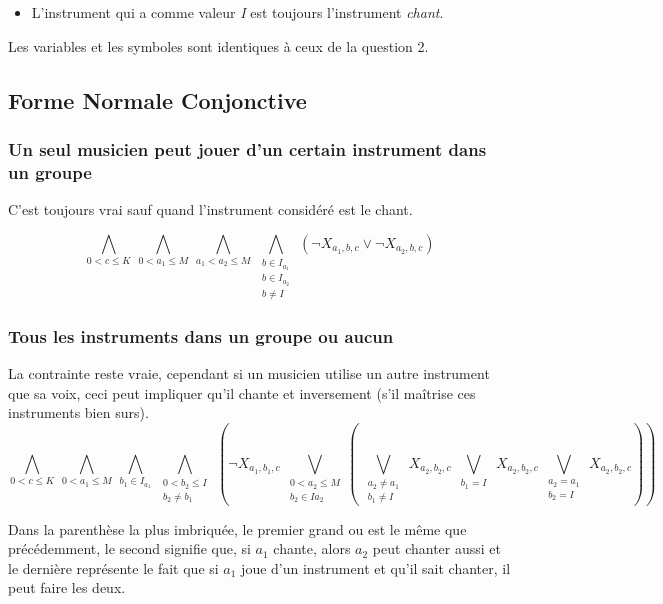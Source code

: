 \documentclass[11pt]{article}
\begin{document}
\begin{itemize}
\item L'instrument qui a comme valeur \textit{I} est toujours l'instrument \textsl{chant}.
\end{itemize}

Les variables et les symboles sont identiques à ceux de la question 2.

\subsection{Forme Normale Conjonctive}

\subsubsection{Un seul musicien peut jouer d'un certain instrument dans un groupe}

C'est toujours vrai sauf quand l'instrument considéré est le chant.

$$\bigwedge\limits_{0<c\le K}\ \bigwedge\limits_{0<a_1\le M}\ \bigwedge\limits_{a_1<a_2\le M}\ \bigwedge\limits_{\substack{b\in I_{a_1} \\ b\in I_{a_2} \\ b \ne I}}\ \left(\neg X_{a_1,b,c} \vee \neg X_{a_2,b,c}\right)$$

\subsubsection{Tous les instruments dans un groupe ou aucun}

La contrainte reste vraie, cependant si un musicien utilise un autre instrument que sa voix, ceci peut impliquer qu'il chante et inversement (s'il maîtrise ces instruments bien surs).\\

$$\bigwedge\limits_{0<c\le K}\ \bigwedge\limits_{0<a_1\le M}\ \bigwedge\limits_{b_1\in I_{a_1}}\ \bigwedge\limits_{\substack{0<b_2\le I \\ b_2 \ne b_1}}\ \left(\neg X_{a_1,b_1,c} \ \bigvee\limits_{\substack{0<a_2\le M \\ b_2 \in I{a_2}}}\left( \
\bigvee\limits_{\substack{a_2 \ne a_1 \\ b_1 \ne I}}\  X_{a_2,b_2,c}\ 
\bigvee\limits_{\substack{b_1 = I}}\ X_{a_2,b_2,c}\ 
\bigvee\limits_{\substack{a_2 = a_1 \\ b_2 = I}}\ X_{a_2,b_2,c}\right)\right)$$

Dans la parenthèse la plus imbriquée, le premier grand ou est le même que précédemment, le second signifie que, si $a_1$ chante, alors $a_2$ peut chanter aussi et le dernière représente le fait que si $a_1$ joue d'un instrument et qu'il sait chanter, il peut faire les deux.
\end{document}
